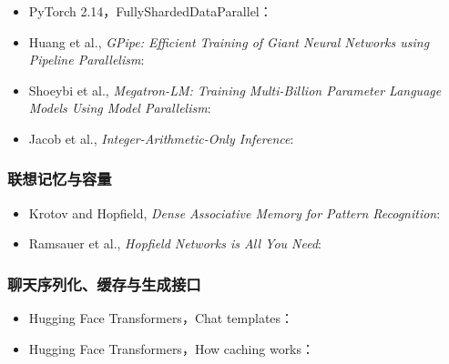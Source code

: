 \begin{itemize}
\item {}\label{source:pytorch-fsdp}PyTorch 2.14，FullyShardedDataParallel：
\item {}\label{source:gpipe}Huang et al., \emph{GPipe: Efficient Training of Giant Neural Networks using Pipeline Parallelism}:
\item {}\label{source:megatron-lm}Shoeybi et al., \emph{Megatron-LM: Training Multi-Billion Parameter Language Models Using Model Parallelism}:
\item {}\label{source:integer-quantization}Jacob et al., \emph{Integer-Arithmetic-Only Inference}:
\end{itemize}

\subsubsection*{联想记忆与容量}
\begin{itemize}
\item {}\label{source:dense-associative-memory}Krotov and Hopfield, \emph{Dense Associative Memory for Pattern Recognition}:
\item {}\label{source:modern-hopfield-attention}Ramsauer et al., \emph{Hopfield Networks is All You Need}:
\end{itemize}

\subsubsection*{聊天序列化、缓存与生成接口}
\begin{itemize}
\item Hugging Face Transformers，Chat templates：
\item Hugging Face Transformers，How caching works：
\end{itemize}

